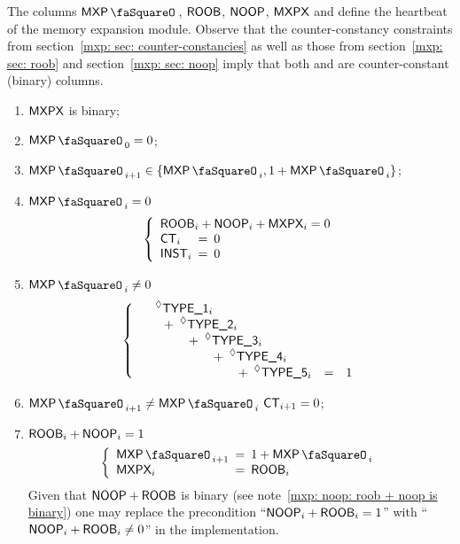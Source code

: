 The columns $\mxpStamp$, $\textsf{ROOB}{}$, $\textsf{NOOP}{}$, $\textsf{MXPX}{}$ and \ct{} define the heartbeat of the memory expansion module. Observe that the counter-constancy constraints from section~\ref{mxp: sec: counter-constancies} as well as those from section~\ref{mxp: sec: roob} and section~\ref{mxp: sec: noop} imply that both \roob{} and \noop{} are counter-constant (binary) columns.
\begin{enumerate}
	\item $\textsf{MXPX}$ is binary;
	\item $\mxpStamp_0 = 0$;
	\item $\mxpStamp_{i+1}\in\{\mxpStamp_{i}, 1 + \mxpStamp_{i}\}$;
	\item \If $\mxpStamp_{i} = 0$ \Then
		\[
			\left\{ \begin{array}{lcl}
				\multicolumn{3}{l}{\roob{}_{i} + \noop{}_{i} + \mxpx{}_{i} = 0} \\
				\ct_{i}		& \!\!\! = \!\!\! & 0 \\
				\INST_{i}	& \!\!\! = \!\!\! & 0 \\
			\end{array} \right.
		\]
	\item \If $\mxpStamp_{i} \neq 0$ \Then
		\[
			\left\{ \begin{array}{lcl}
				\phantom{+ ~} \prescript{\lozenge}{}{\textsf{TYPE\_1}}_{i} \\
				\qquad + ~ \prescript{\lozenge}{}{\textsf{TYPE\_2}}_{i} \\
				\qquad\qquad + ~ \prescript{\lozenge}{}{\textsf{TYPE\_3}}_{i} \\
				\qquad\qquad\qquad + ~ \prescript{\lozenge}{}{\textsf{TYPE\_4}}_{i} \\
				\qquad\qquad\qquad\qquad + ~ \prescript{\lozenge}{}{\textsf{TYPE\_5}}_{i} & = & 1 \\
			\end{array} \right.
		\]
	\item \If $\mxpStamp_{i + 1} \neq \mxpStamp_{i}$ \Then $\textsf{CT}{}_{i+1} = 0$;
	\item \If $\textsf{ROOB}{}_{i} + \textsf{NOOP}{}_{i} = 1$ \Then
		\[
			\left\{ \begin{array}{lcl}
				\mxpStamp_{i+1}	& \!\!\! = \!\!\! & 1 + \mxpStamp_{i} \\
				\mxpx{}_{i}		& \!\!\! = \!\!\! & \roob_{i} \\
			\end{array} \right.
		\]
		\saNote{} Given that $\textsf{NOOP} + \textsf{ROOB}$ is binary (see note~\ref{mxp: noop: roob + noop is binary}) one may replace the precondition
		``$\textsf{NOOP}_{i} + \textsf{ROOB}_{i} =    1$'' with
		``$\textsf{NOOP}_{i} + \textsf{ROOB}_{i} \neq 0$'' in the implementation.
\end{enumerate}
